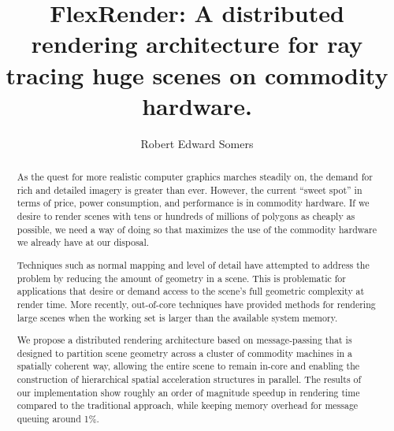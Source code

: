 \documentclass[12pt]{ucthesis}
\begin{document}

\title{FlexRender: A distributed rendering architecture for ray tracing huge
scenes on commodity hardware.}
\author{Robert Edward Somers}
  
 
     



\maketitle

\begin{frontmatter}

\copyrightpage

\committeemembershippage

\begin{abstract}

As the quest for more realistic computer graphics marches steadily on, the
demand for rich and detailed imagery is greater than ever. However, the current
``sweet spot'' in terms of price, power consumption, and performance is in
commodity hardware. If we desire to render scenes with tens or hundreds of millions
of polygons as cheaply as possible, we need a way of doing so that maximizes
the use of the commodity hardware we already have at our disposal.

Techniques such as normal mapping and level of detail have attempted to address
the problem by reducing the amount of geometry in a scene. This is problematic
for applications that desire or demand access to the scene's full geometric
complexity at render time. More recently, out-of-core techniques have provided
methods for rendering large scenes when the working set is larger than the
available system memory.

We propose a distributed rendering architecture based on message-passing that
is designed to partition scene geometry across a cluster of commodity machines
in a spatially coherent way, allowing the entire scene to remain in-core and
enabling the construction of hierarchical spatial acceleration structures in
parallel. The results of our implementation show roughly an order of magnitude
speedup in rendering time compared to the traditional approach, while keeping
memory overhead for message queuing around 1\%.


\end{abstract}
\end{frontmatter}
\end{document}
